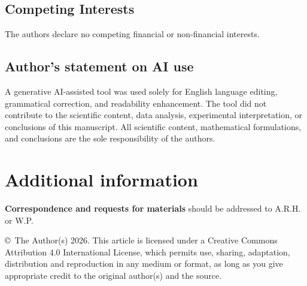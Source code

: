 \documentclass[fleqn,10pt]{article}
\begin{document}
\subsection*{Competing Interests}
The authors declare no competing financial or non-financial interests.

\subsection*{Author's statement on AI use}
A generative AI-assisted tool was used solely for English language editing, grammatical correction, and readability enhancement. The tool did not contribute to the scientific content, data analysis, experimental interpretation, or conclusions of this manuscript. All scientific content, mathematical formulations, and conclusions are the sole responsibility of the authors.

\section*{Additional information}
\textbf{Correspondence and requests for materials} should be addressed to A.R.H. or W.P.

\vspace{1em}
\vspace{0.5em}
\noindent\footnotesize\textsf{\copyright\ The Author(s) 2026. This article is licensed under a Creative Commons Attribution 4.0 International License, which permits use, sharing, adaptation, distribution and reproduction in any medium or format, as long as you give appropriate credit to the original author(s) and the source.}
\end{document}

